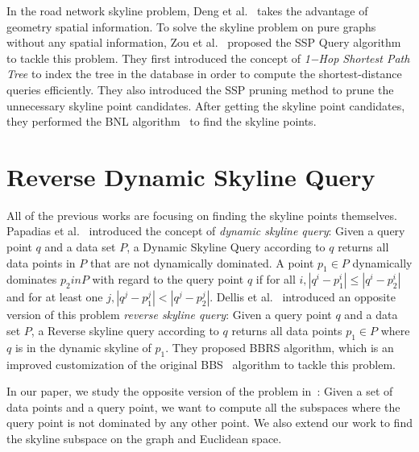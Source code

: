 In the road network skyline problem, Deng et al.~\cite{deng2007multi} takes the advantage of geometry spatial information. To solve the skyline problem on pure graphs without any spatial information, Zou et al.~\cite{zou2010dynamic} proposed the SSP Query algorithm to tackle this problem. They first introduced the concept of \emph{1−Hop Shortest Path Tree} to index the tree in the database in order to compute the shortest-distance queries efficiently. They also introduced the SSP pruning method to prune the unnecessary skyline point candidates. After getting the skyline point candidates, they performed the BNL algorithm~\cite{borzsony2001skyline} to find the skyline points.

\section{Reverse Dynamic Skyline Query}
All of the previous works are focusing on finding the skyline points themselves. Papadias et al.~\cite{papadias2003optimal} introduced the concept of \emph{dynamic skyline query}: Given a query point $q$ and a data set $P$, a Dynamic Skyline Query according to $q$ returns all data points in $P$ that are not dynamically dominated. A point $p_1 \in P$ dynamically dominates $p_2 in P$ with regard to the query point $q$ if for all $i, |q^i-p^i_1| \leq |q^i-p^i_2|$ and for at least one $j, |q^j-p^j_1| < |q^j-p^j_2|$. Dellis et al.~\cite{dellis2007efficient} introduced an opposite version of this problem \emph{reverse skyline query}: Given a query point $q$ and a data set $P$, a Reverse skyline query according to $q$ returns all data points $p_1 \in P$ where $q$ is in the dynamic skyline of $p_1$. They proposed BBRS algorithm, which is an improved customization of the original BBS~\cite{papadias2003optimal} algorithm to tackle this problem.

In our paper, we study the opposite version of the problem in~\cite{tao2006subsky}: Given a set of data points and a query point, we want to compute all the subspaces where the query point is not dominated by any other point. We also extend our work to find the skyline subspace on the graph and Euclidean space.



